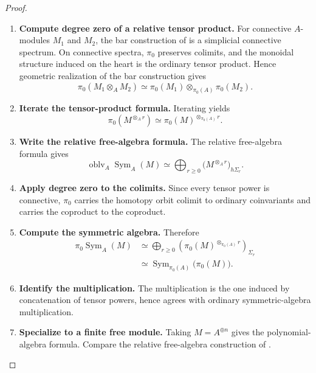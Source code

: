 \begin{proof}
\leavevmode
\begin{enumerate}[label=\textup{(\arabic*)}]
    \item \textbf{Compute degree zero of a relative tensor product.}
    For connective \(A\)-modules \(M_1\) and \(M_2\), the bar construction
    of  is a simplicial connective
    spectrum. On connective spectra, \(\pi_0\) preserves colimits, and the
    monoidal structure induced on the heart is the ordinary tensor product.
    Hence geometric realization of the bar construction gives
    \[
        \pi_0(M_1\otimes_AM_2)
        \simeq
        \pi_0(M_1)\otimes_{\pi_0(A)}\pi_0(M_2).
    \]

    \item \textbf{Iterate the tensor-product formula.}
    Iterating yields
    \[
        \pi_0(M^{\otimes_A r})
        \simeq
        \pi_0(M)^{\otimes_{\pi_0(A)}r}.
    \]

    \item \textbf{Write the relative free-algebra formula.}
    The relative free-algebra formula gives
    \[
        \operatorname{oblv}_A\operatorname{Sym}_A(M)
        \simeq
        \bigoplus_{r\geq0}
        \bigl(M^{\otimes_A r}\bigr)_{h\Sigma_r}.
    \]

    \item \textbf{Apply degree zero to the colimits.}
    Since every tensor power is connective, \(\pi_0\) carries the homotopy
    orbit colimit to ordinary coinvariants and carries the coproduct to the
    coproduct.

    \item \textbf{Compute the symmetric algebra.}
    Therefore
    \[
    \begin{aligned}
        \pi_0\operatorname{Sym}_A(M)
        &\simeq
        \bigoplus_{r\geq0}
        \left(
            \pi_0(M)^{\otimes_{\pi_0(A)}r}
        \right)_{\Sigma_r}
        \\
        &\simeq
        \operatorname{Sym}_{\pi_0(A)}\bigl(\pi_0(M)\bigr).
    \end{aligned}
    \]

    \item \textbf{Identify the multiplication.}
    The multiplication is the one induced by concatenation of tensor powers,
    hence agrees with ordinary symmetric-algebra multiplication.

    \item \textbf{Specialize to a finite free module.}
    Taking
    \(M=A^{\oplus n}\) gives the polynomial-algebra formula. Compare the
    relative free-algebra construction of \cite{LurieHigherAlgebra}.
\end{enumerate}
\end{proof}

